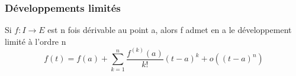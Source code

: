 %
\subsubsection{Développements limités}
%
%
%
%
%
%
%
%
%
\begin{thm}
Si $f : I \rightarrow E$ est n fois dérivable au point a, alors f
admet en a le développement limité à l'ordre n
\[
f(t) = f(a) + \sum_{k=1}^n \frac{f^{(k)}(a)}{k!} (t - a)^k + o((t - a)^n)
\]
\end{thm}
%
